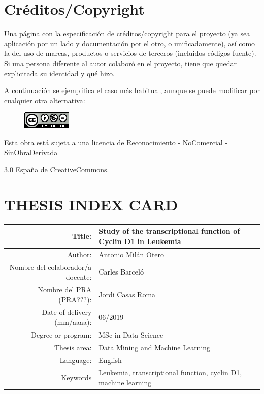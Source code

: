 \setcounter{page}{1} 
\pagestyle{plain}

\chapter*{Créditos/Copyright}

Una página con la especificación de créditos/copyright para el proyecto (ya sea aplicación por un lado y documentación por el otro, o unificadamente), así como la del uso de marcas, productos o servicios de terceros (incluidos códigos fuente). Si una persona diferente al autor colaboró en el proyecto, tiene que quedar explicitada su identidad y qué hizo.

A continuación se ejemplifica el caso más habitual, aunque se puede modificar por cualquier otra alternativa:

\vspace{1cm}

\begin{figure}[ht]
    \centering
	\includegraphics[scale=1]{../images/license.png}
\end{figure}

Esta obra está sujeta a una licencia de Reconocimiento -  NoComercial - SinObraDerivada

\href{https://creativecommons.org/licenses/by-nc-nd/3.0/es/}{3.0 España de CreativeCommons}.

\chapter*{THESIS INDEX CARD}

\begin{table}[ht]
	\centering{}
	\renewcommand{\arraystretch}{2}
	\begin{tabular}{r | p{8cm}}
		\hline
		Title: & Study of the transcriptional function \newline of Cyclin D1 in Leukemia\\
		\hline
        Author: & Antonio Milán Otero\\
		\hline
        Nombre del colaborador/a docente: & Carles Barceló\\
		\hline
        Nombre del PRA (PRA???): & Jordi Casas Roma\\
		\hline
        Date of delivery (mm/aaaa): & 06/2019\\
		\hline
        Degree or program: & MSc in Data Science\\
		\hline
        Thesis area: & Data Mining and Machine Learning\\
		\hline
        Language: & English\\
		\hline
        Keywords & Leukemia, transcriptional function, cyclin D1, machine learning\\
		\hline
	\end{tabular}
\end{table}

